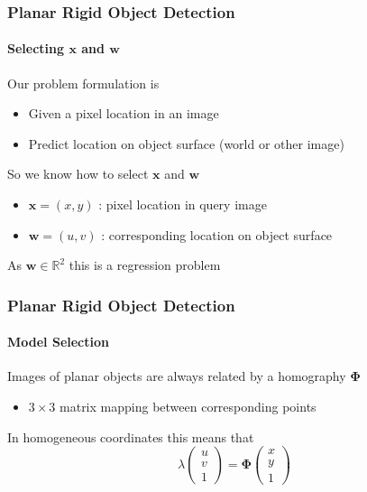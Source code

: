 \documentclass[xetex,professionalfont]{beamer}
\newcommand{\RR}{\mathbb{R}}
\renewcommand{\vec}[1]{\ensuremath{\mathbf{#1}}}
\newcommand{\vw}{\vec{w}}
\newcommand{\vx}{\vec{x}}
\renewcommand\emph[1]{\textcolor{tuwcvl_inf_red}{#1}}
\begin{document}
\begin{frame}
\frametitle{Planar Rigid Object Detection}
\framesubtitle{Selecting $\vx$ and $\vw$}

Our problem formulation is  %
\begin{itemize}
	\item Given a pixel location in an image
	\item Predict location on object surface (world or other image)  %
\end{itemize}

\bigskip
So we know how to select $\vx$ and $\vw$
\begin{itemize}
	\item $\vx=(x,y)$ : pixel location in query image
	\item $\vw=(u,v)$ : corresponding location on object surface %
\end{itemize}

\bigskip
As $\vw\in\RR^2$ this is a \emph{regression problem}

\end{frame}


\begin{frame}
\frametitle{Planar Rigid Object Detection}
\framesubtitle{Model Selection}

Images of planar objects are always related by a \emph{homography} $\boldsymbol{\Phi}$
\begin{itemize}
	\item $3\times3$ matrix mapping between corresponding points
\end{itemize}

\bigskip
In homogeneous coordinates this means that
\[
	\lambda
	\begin{pmatrix}
		u \\ v \\ 1
	\end{pmatrix}
	= \boldsymbol{\Phi}
	\begin{pmatrix}
		x \\ y \\ 1
	\end{pmatrix}
\]

\end{frame}
\end{document}

